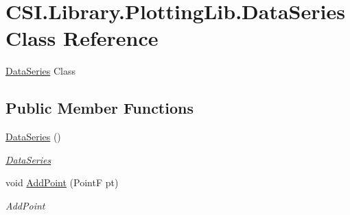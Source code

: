 \hypertarget{class_c_s_i_1_1_library_1_1_plotting_lib_1_1_data_series}{}\section{C\+S\+I.\+Library.\+Plotting\+Lib.\+Data\+Series Class Reference}
\label{class_c_s_i_1_1_library_1_1_plotting_lib_1_1_data_series}


\mbox{\hyperlink{class_c_s_i_1_1_library_1_1_plotting_lib_1_1_data_series}{Data\+Series}} Class  


\subsection*{Public Member Functions}
\begin{DoxyCompactItemize}
\item 
\mbox{\hyperlink{class_c_s_i_1_1_library_1_1_plotting_lib_1_1_data_series_ac2bb5e0cf03ad522bf6ac11639aba985}{Data\+Series}} ()
\begin{DoxyCompactList}\small\item\em \mbox{\hyperlink{class_c_s_i_1_1_library_1_1_plotting_lib_1_1_data_series}{Data\+Series}} \end{DoxyCompactList}\item 
void \mbox{\hyperlink{class_c_s_i_1_1_library_1_1_plotting_lib_1_1_data_series_a3e0f30d57ece27113ad982a0c6b3ef86}{Add\+Point}} (PointF pt)
\begin{DoxyCompactList}\small\item\em Add\+Point \end{DoxyCompactList}\end{DoxyCompactItemize}
